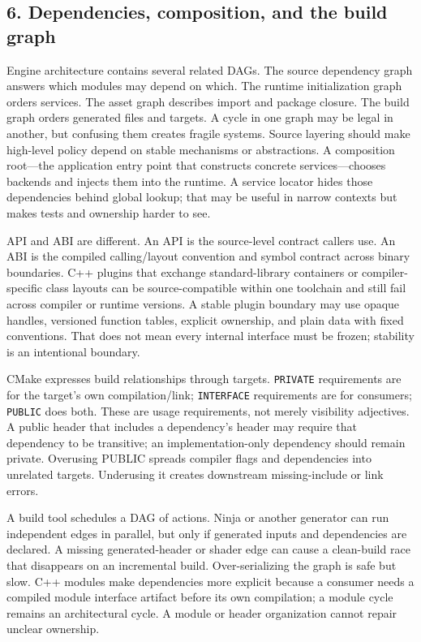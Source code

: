 \subsection{6. Dependencies, composition, and the build graph}\label{05-engine-i-ch008-dependencies-composition-and-the-build-graph}

\hypertarget{05-engine-i-ch008-dependencies-composition-and-the-build-graph}{}

Engine architecture contains several related DAGs. The source dependency graph answers which modules may depend on which. The runtime initialization graph orders services. The asset graph describes import and package closure. The build graph orders generated files and targets. A cycle in one graph may be legal in another, but confusing them creates fragile systems. Source layering should make high-level policy depend on stable mechanisms or abstractions. A composition root---the application entry point that constructs concrete services---chooses backends and injects them into the runtime. A service locator hides those dependencies behind global lookup; that may be useful in narrow contexts but makes tests and ownership harder to see.

API and ABI are different. An API is the source-level contract callers use. An ABI is the compiled calling/layout convention and symbol contract across binary boundaries. C++ plugins that exchange standard-library containers or compiler-specific class layouts can be source-compatible within one toolchain and still fail across compiler or runtime versions. A stable plugin boundary may use opaque handles, versioned function tables, explicit ownership, and plain data with fixed conventions. That does not mean every internal interface must be frozen; stability is an intentional boundary.

CMake expresses build relationships through targets. \texttt{PRIVATE} requirements are for the target's own compilation/link; \texttt{INTERFACE} requirements are for consumers; \texttt{PUBLIC} does both. These are usage requirements, not merely visibility adjectives. A public header that includes a dependency's header may require that dependency to be transitive; an implementation-only dependency should remain private. Overusing PUBLIC spreads compiler flags and dependencies into unrelated targets. Underusing it creates downstream missing-include or link errors.

A build tool schedules a DAG of actions. Ninja or another generator can run independent edges in parallel, but only if generated inputs and dependencies are declared. A missing generated-header or shader edge can cause a clean-build race that disappears on an incremental build. Over-serializing the graph is safe but slow. C++ modules make dependencies more explicit because a consumer needs a compiled module interface artifact before its own compilation; a module cycle remains an architectural cycle. A module or header organization cannot repair unclear ownership.

